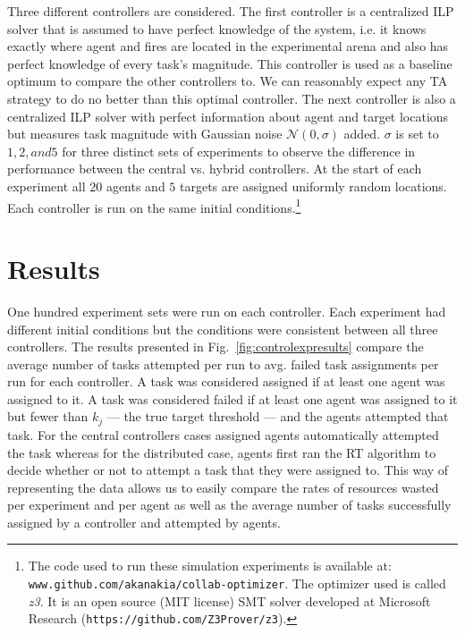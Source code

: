\documentclass[defaultstyle,12pt]{thesis}
\begin{document}
Three different controllers are considered. The first controller is a centralized ILP solver that is assumed to have perfect knowledge of the system, i.e. it knows exactly where agent and fires are located in the experimental arena and also has perfect knowledge of every task's magnitude. This controller is used as a baseline optimum to compare the other controllers to. We can reasonably expect any TA strategy to do no better than this optimal controller. The next controller is also a centralized ILP solver with perfect information about agent and target locations but measures task magnitude with Gaussian noise $\mathcal{N}(0, \sigma)$ added. $\sigma$ is set to $1, 2, and 5$ for three distinct sets of experiments to observe the difference in performance between the central vs. hybrid controllers. At the start of each experiment all $20$ agents and $5$ targets are assigned uniformly random locations. Each controller is run on the same initial conditions.\footnote{The code used to run these simulation experiments is available at: \texttt{www.github.com/akanakia/collab-optimizer}. The optimizer used is called \emph{z3}. It is an open source (MIT license) SMT solver developed at Microsoft Research (\texttt{https://github.com/Z3Prover/z3}).}

\section{Results}
One hundred experiment sets were run on each controller. Each experiment had different initial conditions but the conditions were consistent between all three controllers. The results presented in Fig.~\ref{fig:controlexpresults} compare the average number of tasks attempted per run to avg. failed task assignments per run for each controller. A task was considered assigned if at least one agent was assigned to it. A task was considered failed if at least one agent was assigned to it but fewer than $k_j$ --- the true target threshold --- and the agents attempted that task. For the central controllers cases assigned agents automatically attempted the task whereas for the distributed case, agents first ran the RT algorithm to decide whether or not to attempt a task that they were assigned to. This way of representing the data allows us to easily compare the rates of resources wasted per experiment and per agent as well as the average number of tasks successfully assigned by a controller and attempted by agents.
\end{document}
